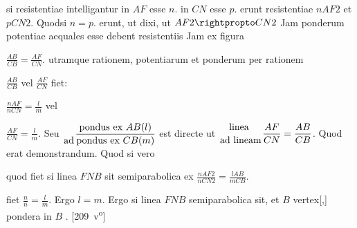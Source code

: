 si resistentiae intelligantur in $AF$ esse $n.$ in $CN$ esse $p.$ erunt resistentiae $nAF2$ et $pCN2.$
Quodsi $n=p.$ erunt, ut dixi, ut $AF2 \rightpropto CN2$
Jam ponderum potentiae\protect{} aequales esse debent resistentiis\protect{}
%
{}
Jam ex figura \protect\rule[-4mm]{0pt}{10mm}$\displaystyle\frac{AB}{CB}=\displaystyle\frac{AF}{CN}$.
utramque rationem, potentiarum et ponderum
per rationem
\rule[-4mm]{0pt}{10mm}%
$\displaystyle\frac{AB}{CB}$ vel $\displaystyle\frac{AF}{CN}$ fiet:
\pend
\newpage
\pstart\noindent%
\rule[-4mm]{0pt}{10mm}
$\displaystyle\frac{nAF}{nCN}=\displaystyle\frac{l}{m}$ vel \rule[-4mm]{0pt}{10mm}$\displaystyle\frac{AF}{CN}=\displaystyle\frac{l}{m}$.
Seu $\displaystyle\efrac{}{\text{ad}}\displaystyle\frac{\text{pondus ex\ } AB (l)}{\text{pondus ex\ } CB (m)}$ est directe ut $\displaystyle\efrac{\text{linea\ }}{\text{ad lineam}}\displaystyle\frac{AF}{CN}=\displaystyle\frac{AB}{CB}$.
Quod erat demonstrandum.
\pend
\pstart%
Quod si vero
\rule[-4mm]{0pt}{10mm}
quod fiet si linea $FNB$ sit semiparabolica ex
$\displaystyle\frac{nAF2}{nCN2}=\displaystyle\frac{lAB}{mCB}.$
\rule[-4mm]{0pt}{10mm}%
fiet $\displaystyle\frac{n}{n}=\displaystyle\frac{l}{m}.$
Ergo $l=m.$
Ergo si linea $FNB$ semiparabolica sit, et $B$ vertex[,] pondera in $B$ .
[209~v\textsuperscript{o}]
\pend
\pstart
